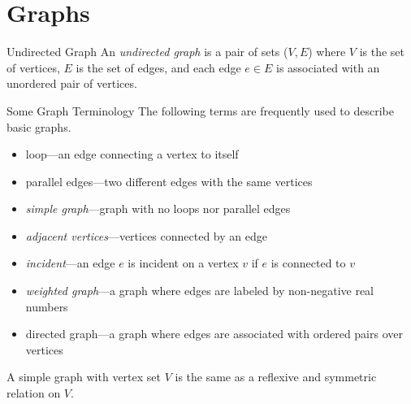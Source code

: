 \documentclass[class=article, crop=false]{standalone}
\begin{document}
  \section{Graphs}
  \begin{definition}{Undirected Graph}
    An \emph{undirected graph} is a pair of sets ($V, E$) where $V$ is the set of vertices, $E$ is the set of edges, and each edge $e\in E$ is associated with an unordered pair of vertices.
  \end{definition}
  \begin{definition}{Some Graph Terminology}
    The following terms are frequently used to describe basic graphs.
    \begin{itemize}
      \item loop---an edge connecting a vertex to itself
      \item parallel edges---two different edges with the same vertices
      \item \emph{simple graph}---graph with no loops nor parallel edges
      \item \emph{adjacent vertices}---vertices connected by an edge
      \item \emph{incident}---an edge $e$ is incident on a vertex $v$ if $e$ is connected to $v$
      \item \emph{weighted graph}---a graph where edges are labeled by non-negative real numbers
      \item directed graph---a graph where edges are associated with ordered pairs over vertices
    \end{itemize}
  \end{definition}
  \begin{note}{}
    A simple graph with vertex set $V$ is the same as a reflexive and symmetric relation on $V$.
  \end{note}
\end{document}
